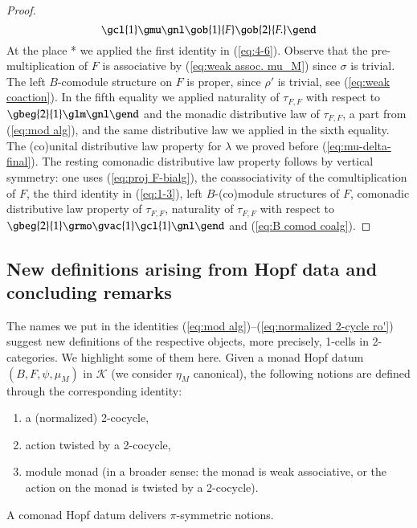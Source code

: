 \documentclass[a4paper, 12pt]{article}
\renewcommand{\_}[1]{\mbox{$_{\left( #1 \right)}$}}
\theoremstyle{plain}
\newcommand{\qed}{\hfill\quad\fbox{\rule[0mm]{0,0cm}{0,0mm}}  \par\bigskip}
\def\K{{\mathcal K}}  %
\newcommand{\equref}[1]{(\ref{eq:#1})}
\begin{document}
\begin{proof}
$$\gcl{1} \gmu \gnl
\gob{1}{F} \gob{2}{F.} 
\gend
$$
At the place * we applied the first identity in \equref{4-6}. Observe that the pre-multiplication of $F$ is associative by \equref{weak assoc. mu_M} since $\sigma$ is trivial. 
The left $B$-comodule structure on $F$ is proper, since $\rho'$ is trivial, see \equref{weak coaction}. In the fifth equality we applied naturality of $\tau_{F,F}$ with respect to 
$\gbeg{2}{1}
\glm \gnl
\gend$ and the monadic distributive law of $\tau_{F,F}$, a part from \equref{mod alg}, and the same distributive law we applied in the sixth equality. The (co)unital 
distributive law property for $\lambda$ we proved before \equref{mu-delta-final}. The resting comonadic distributive law property follows by vertical symmetry: 
one uses \equref{proj F-bialg}, the coassociativity of the comultiplication of $F$, the third identity in \equref{1-3}, left $B$-(co)module structures of $F$, comonadic 
distributive law property of $\tau_{F,F}$, naturality of $\tau_{F,F}$ with respect to 
$\gbeg{2}{1}
\grmo \gvac{1} \gcl{1} \gnl 
\gend$ 
and \equref{B comod coalg}. 
\qed\end{proof}


\subsection{New definitions arising from Hopf data and concluding remarks}



The names we put in the identities \equref{mod alg}--\equref{normalized 2-cycle ro'} suggest new definitions of the respective objects, more precisely, 1-cells in 2-categories.  
We highlight some of them here. Given a monad Hopf datum $(B,F, \psi, \mu_M)$ in $\K$ (we consider $\eta_M$ canonical), the following notions are defined through the corresponding identity: 
\begin{enumerate}
\item a (normalized) 2-cocycle, %
\item action twisted by a 2-cocycle,
\item module monad (in a broader sense: the monad is weak associative, or the action on the monad is twisted by a 2-cocycle).
\end{enumerate}
A comonad Hopf datum delivers $\pi$-symmetric notions. 

\medskip
\end{document}
